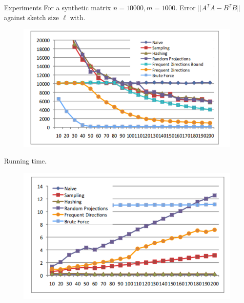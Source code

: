 \documentclass[first=dgreen,second=purple,logo=redque]{aaltoslides}
\begin{document}
\begin{frame}[allowframebreaks=1]{Experiments}
For a synthetic matrix $n=10000, m=1000$. Error $||A^TA -B^TB||$ against sketch size $\ell$ with.
\begin{figure}
  \includegraphics[scale=0.6]{plots/acc}
 \label{fig:fp}
\end{figure}



\framebreak
Running time.
\begin{figure}
  \includegraphics[scale=0.6]{plots/time1}
\end{figure}


\end{frame}
\end{document}
